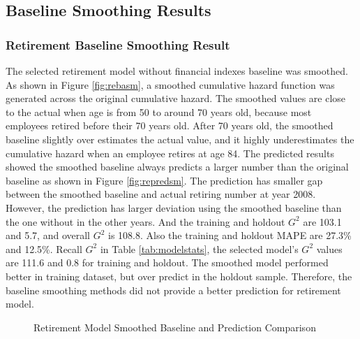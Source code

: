 \subsection{Baseline Smoothing Results}
\subsubsection{Retirement Baseline Smoothing Result}
The selected retirement model without financial indexes baseline was smoothed. As shown in Figure \ref{fig:rebasm}, a smoothed cumulative hazard function was generated across the original cumulative hazard. The smoothed values are close to the actual when age is from 50 to around 70 years old, because most employees retired before their 70 years old. After 70 years old, the smoothed baseline slightly over estimates the actual value, and it highly underestimates the cumulative hazard when an employee retires at age 84. The predicted results showed the smoothed baseline always predicts a larger number than the original baseline as shown in Figure \ref{fig:repredsm}. The prediction has smaller gap between the smoothed baseline and actual retiring number at year 2008. However, the prediction has larger deviation using the smoothed baseline than the one without in the other years. And the training and holdout $G^2$ are 103.1 and 5.7, and overall $G^2$ is 108.8. Also the training and holdout MAPE are 27.3\% and 12.5\%. Recall $G^2$ in Table \ref{tab:modelstats}, the selected model's $G^2$ values are 111.6 and 0.8 for training and holdout. The smoothed model performed better in training dataset, but over predict in the holdout sample. Therefore, the baseline smoothing methods did not provide a better prediction for retirement model.

\begin{figure}[h!]
	\centering
	\caption{Retirement Model Smoothed Baseline and Prediction Comparison}
	\label{fig:rebaselinesm}
\end{figure}
